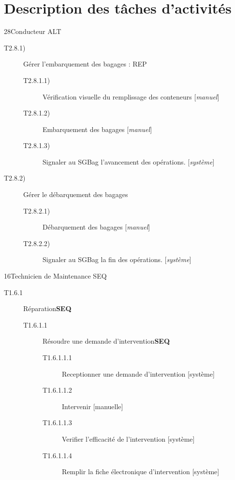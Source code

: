 \part{Description des tâches d'activités}

\dta
{2}{8}{Conducteur}
{ALT}
{
\begin{description}
	\item [T2.8.1)] Gérer l'embarquement des bagages : REP
	\begin{description}
		\item [T2.8.1.1)] Vérification visuelle du remplissage des conteneurs [\textsl{manuel}]
		\item [T2.8.1.2)] Embarquement des bagages [\textsl{manuel}]
		\item [T2.8.1.3)] Signaler au SGBag l'avancement des opérations. [\textsl{système}]
	\end{description}
	\item [T2.8.2)] Gérer le débarquement des bagages
		\begin{description}
			\item [T2.8.2.1)] Débarquement des bagages [\textsl{manuel}]
			\item [T2.8.2.2)] Signaler au SGBag la fin des opérations. [\textsl{système}]
		\end{description}
\end{description}
}
{1}{6}{Technicien de Maintenance}
{SEQ}
{
\begin{description}
	\item[T1.6.1] Réparation\textbf{SEQ}
	\begin{description}
		\item[T1.6.1.1] Résoudre une demande d'intervention\textbf{SEQ}
		\begin{description}
			\item[T1.6.1.1.1] Receptionner une demande d'intervention [système]
			\item[T1.6.1.1.2] Intervenir [manuelle]
			\item[T1.6.1.1.3] Verifier l'efficacité de l'intervention [système]
			\item[T1.6.1.1.4] Remplir la fiche électronique d'intervention [système]
		\end{description}
	\end{description}
\end{description}
}

\hspace{1cm}

